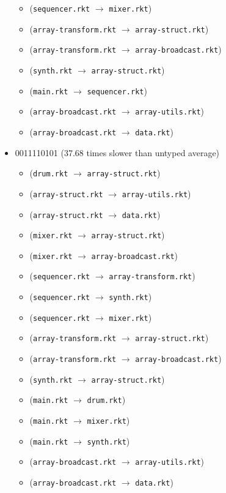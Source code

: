\documentclass{article}
\newcommand{\mono}[1]{\texttt{#1}}
\begin{document}
\begin{itemize}
\begin{itemize}
  \item (\mono{sequencer.rkt} $\rightarrow$ \mono{mixer.rkt})
  \item (\mono{array-transform.rkt} $\rightarrow$ \mono{array-struct.rkt})
  \item (\mono{array-transform.rkt} $\rightarrow$ \mono{array-broadcast.rkt})
  \item (\mono{synth.rkt} $\rightarrow$ \mono{array-struct.rkt})
  \item (\mono{main.rkt} $\rightarrow$ \mono{sequencer.rkt})
  \item (\mono{array-broadcast.rkt} $\rightarrow$ \mono{array-utils.rkt})
  \item (\mono{array-broadcast.rkt} $\rightarrow$ \mono{data.rkt})
  \end{itemize}
\item 0011110101 (37.68 times slower than untyped average)
  \begin{itemize}
  \item (\mono{drum.rkt} $\rightarrow$ \mono{array-struct.rkt})
  \item (\mono{array-struct.rkt} $\rightarrow$ \mono{array-utils.rkt})
  \item (\mono{array-struct.rkt} $\rightarrow$ \mono{data.rkt})
  \item (\mono{mixer.rkt} $\rightarrow$ \mono{array-struct.rkt})
  \item (\mono{mixer.rkt} $\rightarrow$ \mono{array-broadcast.rkt})
  \item (\mono{sequencer.rkt} $\rightarrow$ \mono{array-transform.rkt})
  \item (\mono{sequencer.rkt} $\rightarrow$ \mono{synth.rkt})
  \item (\mono{sequencer.rkt} $\rightarrow$ \mono{mixer.rkt})
  \item (\mono{array-transform.rkt} $\rightarrow$ \mono{array-struct.rkt})
  \item (\mono{array-transform.rkt} $\rightarrow$ \mono{array-broadcast.rkt})
  \item (\mono{synth.rkt} $\rightarrow$ \mono{array-struct.rkt})
  \item (\mono{main.rkt} $\rightarrow$ \mono{drum.rkt})
  \item (\mono{main.rkt} $\rightarrow$ \mono{mixer.rkt})
  \item (\mono{main.rkt} $\rightarrow$ \mono{synth.rkt})
  \item (\mono{array-broadcast.rkt} $\rightarrow$ \mono{array-utils.rkt})
  \item (\mono{array-broadcast.rkt} $\rightarrow$ \mono{data.rkt})

\end{itemize}
\end{itemize}
\end{document}
